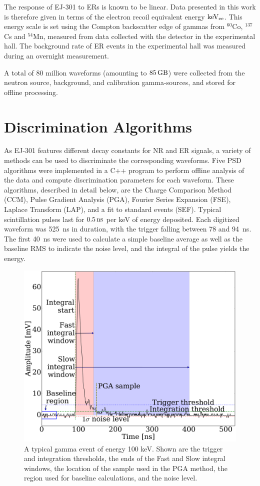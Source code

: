 The response of EJ-301 to ERs is known to be linear. Data presented in this work is therefore given in terms of the electron recoil equivalent energy $\mathrm{keV_{ee}}$. This energy scale is set using the Compton backscatter edge of gammas from $^{60}$Co, $^{137}$Cs and $^{54}$Mn, measured from data collected with the detector in the experimental hall. The background rate of ER events in the experimental hall was measured during an overnight measurement.

A total of 80 million waveforms (amounting to $85\,\mathrm{GB}$) were collected from the neutron source, background, and calibration gamma-sources, and stored for offline processing.

\section{Discrimination Algorithms}\label{sec:algorithms}

As EJ-301 features different decay constants for NR and ER signals, a variety of methods can be used to discriminate the corresponding waveforms. Five PSD algorithms were implemented in a C++ program to perform offline analysis of the data and compute discrimination parameters for each waveform. These algorithms, described in detail below, are the Charge Comparison Method (CCM), Pulse Gradient Analysis (PGA), Fourier Series Expansion (FSE), Laplace Transform (LAP), and a fit to standard events (SEF). Typical scintillation pulses last for $0.5\,\mathrm{ns}$ per keV of energy deposited. Each digitized waveform was 525~ns in duration, with the trigger falling between 78 and 94~ns. The first 40~ns were used to calculate a simple baseline average as well as the baseline RMS to indicate the noise level, and the integral of the pulse yields the energy.

\begin{figure}[htb]
\centering
    \includegraphics[width=\columnwidth]{figures/psd/fig_annotated_event}
    \caption{A typical gamma event of energy 100 keV. Shown are the trigger and integration thresholds, the ends of the Fast and Slow integral windows, the location of the sample used in the PGA method, the region used for baseline calculations, and the noise level.}\label{fig:psd_waveform}
\end{figure}

